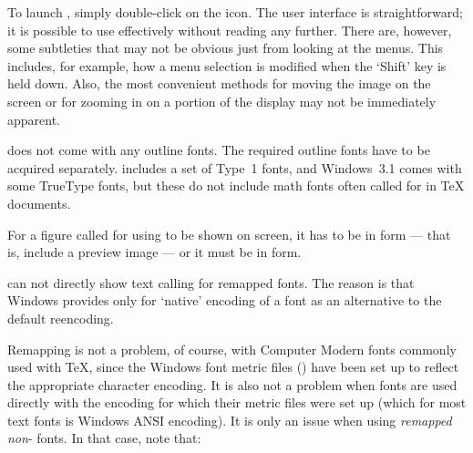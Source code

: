 To launch {\DVIWindo}, simply double-click on the {\DVIWindo} icon. 
The user interface is straight\-forward; %
it is possible to use {\DVIWindo} effectively without reading any further.  
There are, however, some subtleties that may not be obvious just from
looking at the menus. 
This includes, for example, how a menu selection is modified when the
`Shift' key is held down. %
Also, the most convenient methods for moving the image on the screen or
for zooming in on a portion of the display may not be immediately apparent.


\beginbullets


\bpar {\DVIWindo} does not come %
with any outline fonts.  
The required outline fonts have to be acquired separately.
{\ATM} includes a set of Type~1 fonts, 
and Windows~3.1 comes with some True\-Type fonts, 
but these do not include math fonts often called for in {\TeX} documents.


\bpar For a figure called for using {\lavender\verb@\special@\revert} 
to be shown on screen, it has to be in {\EPSF} form --- 
that is, include a {\TIFF} preview image ---
or it must be in {\EPSI} form.

\bpar {\DVIWindo} can not directly show text calling for remapped fonts.
The reason is that Windows %
provides only  for `native' encoding %
of a font as an alternative to the default {\ANSI} reencoding.

\endbullets

\noindent
Remapping is not a problem, of course, with Computer Modern fonts
commonly used with {\TeX}, since the Windows font metric files
({\PFM}) have been set up to reflect the appropriate character encoding.
It is also not a problem when fonts are used directly with the encoding
for which their metric files were set up 
(which for most text fonts is Windows ANSI encoding). 
It is only an issue when using {\it remapped} {\it non}-{\CM} fonts.
In that case, note that: %

